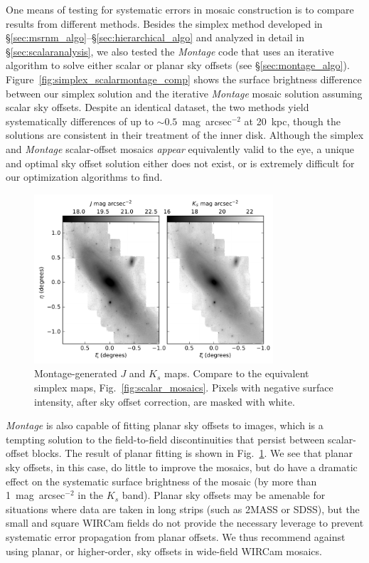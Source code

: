 \documentclass[iop]{emulateapj}
\newcommand{\sw}[1]{\textit{#1}} %
\newcommand{\Fig}[1]{Fig.~\ref{fig:#1}}  %
\newcommand{\Sec}[1]{\S\ref{sec:#1}}  %
\begin{document}
One means of testing for systematic errors in mosaic construction is to compare results from different methods.
Besides the simplex method developed in \Sec{msrnm_algo}--\Sec{hierarchical_algo} and analyzed in detail in \Sec{scalaranalysis}, we also tested the \sw{Montage} code that uses an iterative algorithm to solve either scalar or planar sky offsets (see \Sec{montage_algo}).
Figure~\ref{fig:simplex_scalarmontage_comp} shows the surface brightness difference between our simplex solution and the iterative \sw{Montage} mosaic solution assuming scalar sky offsets.
Despite an identical dataset, the two methods yield systematically differences of up to $\sim 0.5$~mag~arcsec$^{-2}$ at 20~kpc, though the solutions are consistent in their treatment of the inner disk.
Although the simplex and \sw{Montage} scalar-offset mosaics \emph{appear} equivalently valid to the eye, a unique and optimal sky offset solution either does not exist, or is extremely difficult for our optimization algorithms to find.

\begin{figure}[t]
\centering
\includegraphics[width=3.5in]{figs/montage_planar_mosaics.pdf}
\caption{Montage-generated $J$ and $K_s$ maps. Compare to the equivalent simplex maps, \Fig{scalar_mosaics}. Pixels with negative surface intensity, after sky offset correction, are masked with white.}
\label{fig:montage_planar_mosaics}
\end{figure}

\sw{Montage} is also capable of fitting planar sky offsets to images, which is a tempting solution to the field-to-field discontinuities that persist between scalar-offset blocks.
The result of planar fitting is shown in \Fig{montage_planar_mosaics}.
We see that planar sky offsets, in this case, do little to improve the mosaics, but do have a dramatic effect on the systematic surface brightness of the mosaic (by more than 1~mag~arcsec$^{-2}$ in the $K_s$ band).
Planar sky offsets may be amenable for situations where data are taken in long strips (such as 2MASS or SDSS), but the small and square WIRCam fields do not provide the necessary leverage to prevent systematic error propagation from planar offsets.
We thus recommend against using planar, or higher-order, sky offsets in wide-field WIRCam mosaics.
\end{document}
